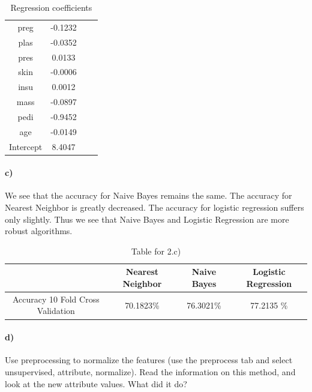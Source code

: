 \documentclass{article}
\begin{document}
\begin{table}[ht]
    \begin{center}
    \begin{tabular}{|c|c|c|c|}
   \hline
preg          &       -0.1232\\
plas             &    -0.0352\\
pres               &   0.0133\\
skin              &   -0.0006\\
insu               &   0.0012\\
mass              &   -0.0897\\
pedi             &    -0.9452\\
age            &      -0.0149\\   \hline
Intercept      &       8.4047\\    \hline%
    \end{tabular} \caption{Regression coefficients}\label{tab:coeffs}
    \end{center}
\end{table}



\paragraph{c)}We see that the accuracy for Naive Bayes remains the same. The accuracy for Nearest Neighbor is greatly decreased. The accuracy for logistic regression suffers only slightly. Thus we see that Naive Bayes and Logistic Regression are more robust algorithms. 

\begin{table}[H]
    \begin{center}
    \begin{tabular}{|c|c|c|c|}
   \hline
        & Nearest Neighbor & Naive Bayes & Logistic Regression \\ \hline
         Accuracy 10 Fold Cross Validation &  70.1823\%&76.3021\% &  77.2135 \%   \\ \hline
       
             
     
    \end{tabular}\caption{Table for 2.c)}
    \end{center}
\end{table}



\paragraph{d)}
Use preprocessing to normalize the features (use the preprocess tab and select unsupervised, attribute, normalize). Read the information on this method, and look at the new attribute values. What did it do?
\end{document}
